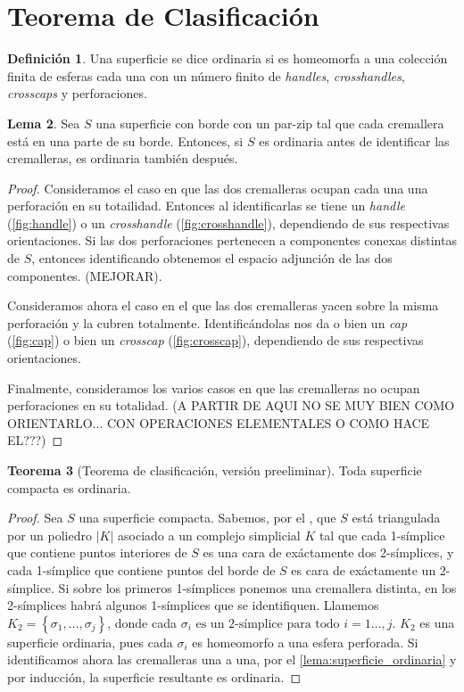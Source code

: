 \documentclass[10pt]{report}
\theoremstyle{definition}
\newtheorem{defin}{Definición}[section]
\newtheorem{tma}[defin]{Teorema}
\newtheorem{lema}[defin]{Lema}
\begin{document}
\section{Teorema de Clasificación}

\begin{defin}%
Una superficie se dice ordinaria si es homeomorfa a una colección finita de esferas cada una con un número finito de \textit{handles}, \textit{crosshandles}, \textit{crosscaps} y perforaciones.
\end{defin}


\begin{lema}%
Sea $S$ una superficie con borde con un par-zip tal que cada cremallera está en una parte de su borde. Entonces, si $S$ es ordinaria antes de identificar las cremalleras, es ordinaria también después.\label{lema:superficie_ordinaria}
\end{lema}
\begin{proof}
Consideramos el caso en que las dos cremalleras ocupan cada una una perforación en su totailidad. Entonces al identificarlas se tiene un \textit{handle} (\autoref{fig:handle}) o un \textit{crosshandle} (\autoref{fig:crosshandle}), dependiendo de sus respectivas orientaciones. Si las dos perforaciones pertenecen a componentes conexas distintas de $S$, entonces identificando obtenemos el espacio adjunción de las dos componentes. (MEJORAR). 

Consideramos ahora el caso en el que las dos cremalleras yacen sobre la misma perforación y la cubren totalmente. Identificándolas nos da o bien un \textit{cap} (\autoref{fig:cap}) o bien un \textit{crosscap} (\autoref{fig:crosscap}), dependiendo de sus respectivas orientaciones.

Finalmente, consideramos los varios casos en que las cremalleras no ocupan perforaciones en su totalidad. (A PARTIR DE AQUI NO SE MUY BIEN COMO ORIENTARLO... CON OPERACIONES ELEMENTALES O COMO HACE EL???) 
\end{proof}

\begin{tma}[Teorema de clasificación, versión preeliminar] %
Toda superficie compacta es ordinaria.
\end{tma}
\begin{proof}
Sea $S$ una superficie compacta. Sabemos, por el , que $S$ está triangulada por un poliedro $|K|$ asociado a un complejo simplicial $K$ tal que cada 1-símplice que contiene puntos interiores de $S$ es una cara de exáctamente dos 2-símplices, y cada 1-símplice que contiene puntos del borde de $S$ es cara de exáctamente un 2-símplice. Si sobre los primeros 1-símplices ponemos una cremallera distinta, en los 2-símplices habrá algunos 1-símplices que se identifiquen. Llamemos $K_2=\left\{\sigma_1,\dots ,\sigma_j\right\}$, donde cada $\sigma_i \text{ es un 2-símplice para todo } i=1\dots ,j$. $K_2$ es una superficie ordinaria, pues cada $\sigma_i$ es homeomorfo a una esfera perforada. Si identificamos ahora las cremalleras una a una, por el \autoref{lema:superficie_ordinaria} y por inducción, la superficie resultante es ordinaria.
\end{proof}
\end{document}
